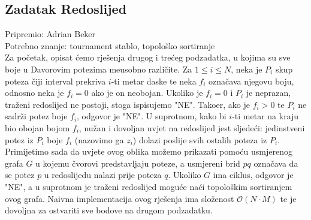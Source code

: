 \subsection*{Zadatak Redoslijed}
\textsf{Pripremio: Adrian Beker}\\
\textsf{Potrebno znanje: tournament stablo, topološko sortiranje}\\

Za početak, opisat ćemo rješenja drugog i trećeg podzadatka, u kojima su sve
boje u Davorovim potezima me\dj usobno razli\v{c}ite. Za $1 \leq i \leq N$,
neka je $P_i$ skup poteza čiji interval prekriva $i$-ti metar daske te neka
$f_i$ označava njegovu boju, odnosno neka je $f_i = 0$ ako je on neobojan.
Ukoliko je $f_i = 0$ i $P_i$ je neprazan, traženi redoslijed ne postoji, stoga
ispisujemo "NE". Tako\dj er, ako je $f_i > 0$ te $P_i$ ne sadrži potez boje
$f_i$, odgovor je "NE". U suprotnom, kako bi $i$-ti metar na kraju bio obojan
bojom $f_i$, nužan i dovoljan uvjet na redoslijed jest sljedeći: jedinstveni
potez iz $P_i$ boje $f_i$ (nazovimo ga $z_i$) dolazi poslije svih ostalih
poteza iz $P_i$. Primijetimo sada da uvjete ovog oblika možemo prikazati pomoću
usmjerenog grafa $G$ u kojemu čvorovi predstavljaju poteze, a usmjereni brid
$pq$ označava da se potez $p$ u redoslijedu nalazi prije poteza $q$. Ukoliko
$G$ ima ciklus, odgovor je "NE", a u suprotnom je traženi redoslijed moguće
naći topološkim sortiranjem ovog grafa. Naivna implementacija ovog rješenja ima
složenost $\mathcal{O}(N \cdot M)$ te je dovoljna za ostvariti sve bodove na
drugom podzadatku.

